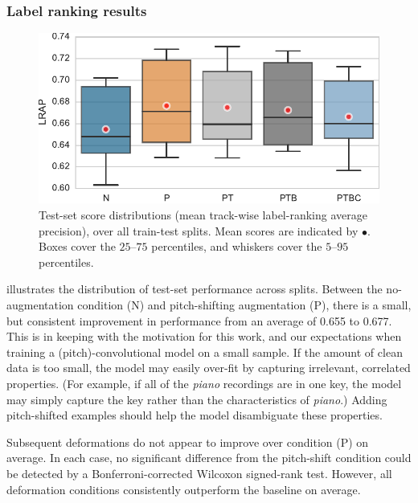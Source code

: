 \documentclass{article}
\begin{document}
\subsubsection{Label ranking results}
\begin{figure}
    \centering
    \includegraphics[width=\columnwidth]{figs/lrapall}
    \caption{Test-set score distributions (mean track-wise label-ranking average
        precision), over all train-test splits. Mean scores are indicated by \color{red}
        $\bullet$\normalcolor{}.
        Boxes cover the $25$--$75$ percentiles, and whiskers cover the $5$--$95$
        percentiles.\label{lrapresults}}
\end{figure}

 illustrates the distribution of test-set performance across splits. 
Between the no-augmentation condition (N) and pitch-shifting augmentation (P), 
there is a small, but consistent improvement in performance from an average of 0.655 to
0.677.  This is in keeping with the motivation for this work, and our 
expectations when training a (pitch)-convolutional model on a small sample.
If the amount of clean data is too small, the model may easily over-fit by capturing
irrelevant, correlated properties.
(For example, if all of the \emph{piano} recordings are in one key, the model may simply
capture the key rather than the characteristics of \emph{piano}.)
Adding pitch-shifted examples should help the model disambiguate these properties.

Subsequent deformations do not appear to improve over condition (P) on average.
In each case, no significant difference from the pitch-shift condition could be detected 
by a Bonferroni-corrected Wilcoxon signed-rank test.
However, all deformation conditions consistently outperform the baseline on average.
\end{document}
